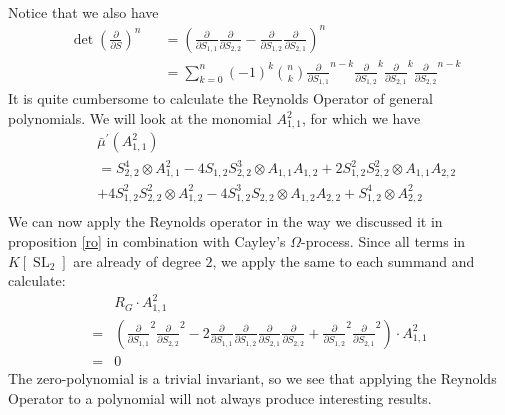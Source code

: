 \begin{example}
\begin{equation}
\begin{aligned}
    \end{aligned}
  \end{equation}
  Notice that we also have
  \begin{equation}
    \begin{aligned}
      &\operatorname{det}\left( \frac{\partial}{\partial S} \right)^n
      &&= \left( \frac{\partial}{\partial S_{1,1}} \frac{\partial}{\partial S_{2,2}} - \frac{\partial}{\partial S_{1,2}} \frac{\partial}{\partial S_{2,1}} \right)^n \\
      &&&= \sum_{k=0}^n (-1)^k \binom{n}{k} \frac{\partial}{\partial S_{1,1}}^{n-k} \frac{\partial}{\partial S_{1,2}}^k \frac{\partial}{\partial S_{2,1}}^k \frac{\partial}{\partial S_{2,2}}^{n-k}
    \end{aligned}
  \end{equation}
  It is quite cumbersome to calculate the Reynolds Operator of general polynomials.
  We will look at the monomial $A_{1,1}^2$, for which we have
  \begin{equation}
    \begin{aligned}
      &&&\bar{\mu}^\prime (A_{1,1}^2) \\
      &&&= S_{2,2}^4 \otimes A_{1,1}^2 - 4S_{1,2}S_{2,2}^3 \otimes A_{1,1}A_{1,2} + 2S_{1,2}^2 S_{2,2}^2 \otimes A_{1,1}A_{2,2} \\
      &&& + 4S_{1,2}^2 S_{2,2}^2 \otimes A_{1,2}^2 - 4S_{1,2}^3 S_{2,2} \otimes A_{1,2}A_{2,2} + S_{1,2}^4 \otimes A_{2,2}^2\\
    \end{aligned}
  \end{equation}
  We can now apply the Reynolds operator in the way we discussed it in proposition \ref{ro} in combination with Cayley's $\Omega$-process.
  Since all terms in $K[\operatorname{SL}_2]$ are already of degree $2$, we apply the same to each summand and calculate:
  \begin{equation}
    \begin{aligned}
      & R_G \cdot A_{1,1}^2 \\
      =& \left( \frac{\partial}{\partial S_{1,1}}^2 \frac{\partial}{\partial S_{2,2}}^2 - 2 \frac{\partial}{\partial S_{1,1}} \frac{\partial}{\partial S_{1,2}} \frac{\partial}{\partial S_{2,1}} \frac{\partial}{\partial S_{2,2}} + \frac{\partial}{\partial S_{1,2}}^2\frac{\partial}{\partial S_{2,1}}^2 \right) \cdot A_{1,1}^2 \\
      =& 0
    \end{aligned}
  \end{equation}
  The zero-polynomial is a trivial invariant, so we see that applying the Reynolds Operator to a polynomial will not always produce interesting results.

\end{example}

